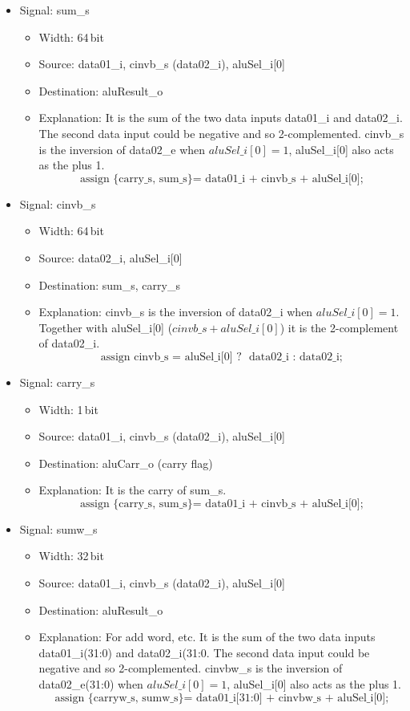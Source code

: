 \begin{itemize}
\begin{itemize}
  \end{itemize}
  \item Signal: sum\_s
  \begin{itemize}
    \item Width: 64\,bit
    \item Source: data01\_i, cinvb\_s (data02\_i), aluSel\_i[0]
    \item Destination: aluResult\_o
    \item Explanation: It is the sum of the two data inputs data01\_i and data02\_i. The second data input could be negative and so 2-complemented. cinvb\_s is the inversion of data02\_e when $aluSel\_i[0] = 1$, aluSel\_i[0] also acts as the plus 1. \[ \mbox{assign \{carry\_s, sum\_s\}   = data01\_i + cinvb\_s + aluSel\_i[0];} \]
  \end{itemize}
  \item Signal: cinvb\_s
  \begin{itemize}
    \item Width: 64\,bit
    \item Source: data02\_i, aluSel\_i[0]
    \item Destination: sum\_s, carry\_s
    \item Explanation: cinvb\_s is the inversion of data02\_i when $aluSel\_i[0] = 1$. Together with aluSel\_i[0] ($cinvb\_s + aluSel\_i[0]$) it is the 2-complement of data02\_i. \[ \mbox{assign cinvb\_s = aluSel\_i[0] ? ~data02\_i : data02\_i;} \]
  \end{itemize}
  \item Signal: carry\_s
  \begin{itemize}
    \item Width: 1\,bit
    \item Source: data01\_i, cinvb\_s (data02\_i), aluSel\_i[0]
    \item Destination: aluCarr\_o (carry flag)
    \item Explanation: It is the carry of sum\_s. \[ \mbox{assign \{carry\_s, sum\_s\}   = data01\_i + cinvb\_s + aluSel\_i[0];} \]
  \end{itemize}
  \item Signal: sumw\_s
  \begin{itemize}
    \item Width: 32\,bit
    \item Source: data01\_i, cinvb\_s (data02\_i), aluSel\_i[0]
    \item Destination: aluResult\_o
    \item Explanation: For add word, etc. It is the sum of the two data inputs data01\_i(31:0) and data02\_i(31:0. The second data input could be negative and so 2-complemented. cinvbw\_s is the inversion of data02\_e(31:0) when $aluSel\_i[0] = 1$, aluSel\_i[0] also acts as the plus 1. \[ \mbox{assign \{carryw\_s, sumw\_s\}   = data01\_i[31:0] + cinvbw\_s + aluSel\_i[0];} \]

\end{itemize}
\end{itemize}
